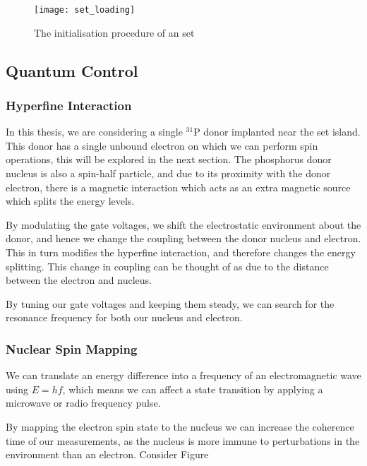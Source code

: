 	\begin{figure}[htbp!]
		\centering
		\texttt{[image: set\_loading]}
		\caption[The initiliasation prodedure]{The initialisation procedure of an \gls{set}\cite{morello2010single}}
		\label{fig::set_loading}
	\end{figure}
	
\subsection{Quantum Control}
	\subsubsection{Hyperfine Interaction}
		In this thesis, we are considering a single $^{31}$P donor implanted near the \gls{set} island. This donor has a single unbound electron on which we can perform spin operations, this will be explored in the next section. The phosphorus donor nucleus is also a spin-half particle, and due to its proximity with the donor electron, there is a magnetic interaction which acts as an extra magnetic source which splits the energy levels.
		
		By modulating the gate voltages, we shift the electrostatic environment about the donor, and hence we change the coupling between the donor nucleus and electron. This in turn modifies the hyperfine interaction, and therefore changes the energy splitting. This change in coupling can be thought of as due to the distance between the electron and nucleus.
		
		By tuning our gate voltages and keeping them steady, we can search for the resonance frequency for both our nucleus and electron. 
	\subsubsection{Nuclear Spin Mapping}
		We can translate an energy difference into a frequency of an electromagnetic wave using $E = h f$, which means we can affect a state transition by applying a microwave or radio frequency pulse.
		
		By mapping the electron spin state to the nucleus we can increase the coherence time of our measurements, as the nucleus is more immune to perturbations in the environment than an electron. Consider Figure 
		
